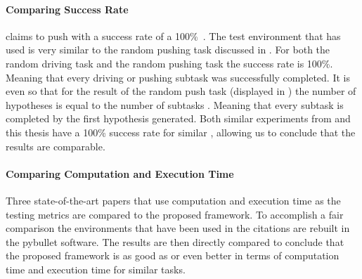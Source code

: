 \paragraph{Comparing Success Rate}
\citeauthor{ellis_navigation_2022} claims to push with a success rate  of a 100\%~\cite{ellis_navigation_2022}. The test environment that \citeauthor{ellis_navigation_2022} has used is very similar to the random pushing task discussed in . For both the random driving task and the random pushing task the success rate is 100\%. Meaning that every driving or pushing subtask was successfully completed. It is even so that for the result of the random push task (displayed in ) the number of hypotheses is equal to the number of subtasks . Meaning that every subtask is completed by the first hypothesis generated. Both similar experiments from \citeauthor{ellis_navigation_2022} and this thesis have a 100\% success rate for similar
, allowing us to conclude that the results are comparable.

\paragraph{Comparing Computation and Execution Time}
Three state-of-the-art papers that use computation and execution time as the testing metrics are compared to the proposed framework. To accomplish a fair comparison the environments that have been used in the  citations are rebuilt in the pybullet software. The results are then directly compared to conclude that the proposed framework is as good as or even better in terms of computation time and execution time for similar tasks.\bs

